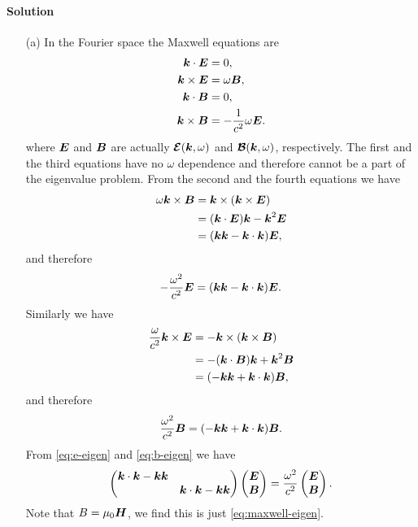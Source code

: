 \documentclass[hyperref, a4paper]{article}
\begin{document}
\paragraph{Solution} \begin{itemize}
\item[(a)] In the Fourier space the Maxwell equations are 
\[
    \begin{aligned}
        \vb*{k} \cdot \vb*{E} &= 0, \\ 
        \vb*{k} \times \vb*{E} &= \omega \vb*{B}, \\
        \vb*{k} \cdot \vb*{B} &= 0, \\
        \vb*{k} \times \vb*{B} &= - \frac{1}{c^2} \omega \vb*{E}.
    \end{aligned}
\]
where $\vb*{E}$ and $\vb*{B}$ are actually $\vb*{\mathcal{E}}(\vb*{k}, \omega)$ 
and $\vb*{\mathcal{B}}(\vb*{k}, \omega)$, respectively. The first and the third equations have 
no $\omega$ dependence and therefore cannot be a part of the eigenvalue problem. 
From the second and the fourth equations we have 
\[
    \begin{aligned}
        \omega \vb*{k} \times \vb*{B} &= \vb*{k} \times (\vb*{k} \times \vb*{E}) \\
        &= (\vb*{k} \cdot \vb*{E}) \vb*{k} - \vb*{k}^2 \vb*{E} \\
        &= (\vb*{k} \vb*{k} - \vb*{k} \cdot \vb*{k}) \vb*{E},
    \end{aligned}
\]
and therefore 
\begin{equation}
    - \frac{\omega^2}{c^2} \vb*{E} = (\vb*{k} \vb*{k} - \vb*{k} \cdot \vb*{k}) \vb*{E}.
    \label{eq:e-eigen}
\end{equation}
Similarly we have 
\[
    \begin{aligned}
        \frac{\omega}{c^2} \vb*{k} \times \vb*{E} &= - \vb*{k} \times (\vb*{k} \times \vb*{B}) \\
        &= - (\vb*{k} \cdot \vb*{B}) \vb*{k} + \vb*{k}^2 \vb*{B} \\
        &= (- \vb*{k} \vb*{k} + \vb*{k} \cdot \vb*{k}) \vb*{B}, 
    \end{aligned}
\]
and therefore 
\begin{equation}
    \frac{\omega^2}{c^2} \vb*{B} = (- \vb*{k} \vb*{k} + \vb*{k} \cdot \vb*{k}) \vb*{B}.
    \label{eq:b-eigen}
\end{equation}
From \eqref{eq:e-eigen} and \eqref{eq:b-eigen} we have 
\begin{equation}
    \pmqty{\dmat{ \vb*{k} \cdot \vb*{k} - \vb*{k} \vb*{k} , \vb*{k} \cdot \vb*{k} - \vb*{k} \vb*{k} }} 
    \pmqty{\vb*{E} \\ \vb*{B}} = \frac{\omega^2}{c^2} \pmqty{\vb*{E} \\ \vb*{B}}. 
\end{equation}
Note that $B = \mu_0 \vb*{H}$, we find this is just \eqref{eq:maxwell-eigen}.


\end{itemize}
\end{document}
